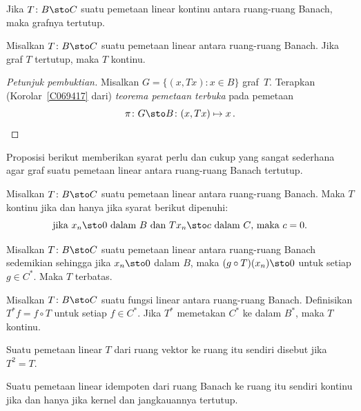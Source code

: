 \begin{exer} Jika $T\colon B \sto C$ suatu pemetaan linear kontinu antara ruang-ruang Banach, maka grafnya tertutup.
\end{exer}

\begin{thm}\label{thm_CGT} Misalkan $T\colon B \sto C$ suatu pemetaan linear antara ruang-ruang Banach.
Jika graf $T$ tertutup, maka $T$ kontinu.
\end{thm}

\begin{proof}[\emph{Petunjuk pembuktian}] Misalkan $G = \{(x,Tx)\colon x \in B\}$ graf~$T$. Terapkan
(Korolar~\ref{C069417} dari) \emph{teorema pemetaan terbuka} pada pemetaan
  \[ \pi\colon G \sto B\colon (x,Tx) \mapsto x\,. \]
\ns \end{proof}

Proposisi berikut memberikan syarat perlu dan cukup yang sangat sederhana agar graf suatu pemetaan linear antara ruang-ruang Banach
tertutup.

\begin{prop}\label{prop_nasc_closed_graph} Misalkan $T\colon B \sto C$ suatu pemetaan linear antara ruang-ruang Banach. Maka $T$
kontinu jika dan hanya jika syarat berikut dipenuhi:
   \[ \text{jika $x_n \sto 0$ dalam $B$ dan $Tx_n \sto c$ dalam $C$, maka $c = 0$.} \]
\end{prop}

\begin{prop} Misalkan $T \colon B \sto C$ suatu pemetaan linear antara ruang-ruang Banach sedemikian sehingga jika
$x_n \sto 0$ dalam $B$, maka $(g \circ T)(x_n) \sto 0$ untuk setiap $g \in C^*$.  Maka $T$
terbatas.
\end{prop}

\begin{prop} Misalkan $T \colon B \sto C$ suatu fungsi linear antara ruang-ruang Banach. Definisikan
$T^*f = f \circ T$ untuk setiap $f \in C^*$.  Jika $T^*$ memetakan $C^*$ ke dalam $B^*$, maka $T$
kontinu.
\end{prop}

\begin{defn}\label{C069624} Suatu pemetaan linear $T$ dari ruang vektor ke ruang itu sendiri disebut
 jika $T^2 = T$.
\end{defn}

\begin{prop}\label{prop_cont_idem_op} Suatu pemetaan linear idempoten dari ruang Banach ke ruang itu sendiri
kontinu jika dan hanya jika kernel dan jangkauannya tertutup.
\end{prop}

